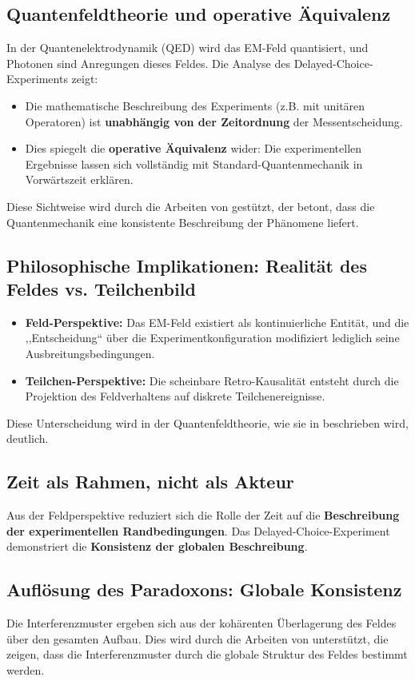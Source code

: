 \documentclass[12pt,a4paper]{article}
\begin{document}
\subsection{Quantenfeldtheorie und operative Äquivalenz}
In der Quantenelektrodynamik (QED) wird das EM-Feld quantisiert, und Photonen sind Anregungen dieses Feldes. Die Analyse des Delayed-Choice-Experiments zeigt:
\begin{itemize}
	\item Die mathematische Beschreibung des Experiments (z.B. mit unitären Operatoren) ist \textbf{unabhängig von der Zeitordnung} der Messentscheidung.
	\item Dies spiegelt die \textbf{operative Äquivalenz} wider: Die experimentellen Ergebnisse lassen sich vollständig mit Standard-Quantenmechanik in Vorwärtszeit erklären.
\end{itemize}

Diese Sichtweise wird durch die Arbeiten von \cite{zeilinger1999} gestützt, der betont, dass die Quantenmechanik eine konsistente Beschreibung der Phänomene liefert.

\subsection{Philosophische Implikationen: Realität des Feldes vs. Teilchenbild}
\begin{itemize}
	\item \textbf{Feld-Perspektive:} Das EM-Feld existiert als kontinuierliche Entität, und die ,,Entscheidung`` über die Experimentkonfiguration modifiziert lediglich seine Ausbreitungsbedingungen.
	\item \textbf{Teilchen-Perspektive:} Die scheinbare Retro-Kausalität entsteht durch die Projektion des Feldverhaltens auf diskrete Teilchenereignisse.
\end{itemize}

Diese Unterscheidung wird in der Quantenfeldtheorie, wie sie in \cite{peskin1995} beschrieben wird, deutlich.

\subsection{Zeit als Rahmen, nicht als Akteur}
Aus der Feldperspektive reduziert sich die Rolle der Zeit auf die \textbf{Beschreibung der experimentellen Randbedingungen}. Das Delayed-Choice-Experiment demonstriert die \textbf{Konsistenz der globalen Beschreibung}.

\subsection{Auflösung des Paradoxons: Globale Konsistenz}
Die Interferenzmuster ergeben sich aus der kohärenten Überlagerung des Feldes über den gesamten Aufbau. Dies wird durch die Arbeiten von \cite{mandel1995} unterstützt, die zeigen, dass die Interferenzmuster durch die globale Struktur des Feldes bestimmt werden.
\end{document}
